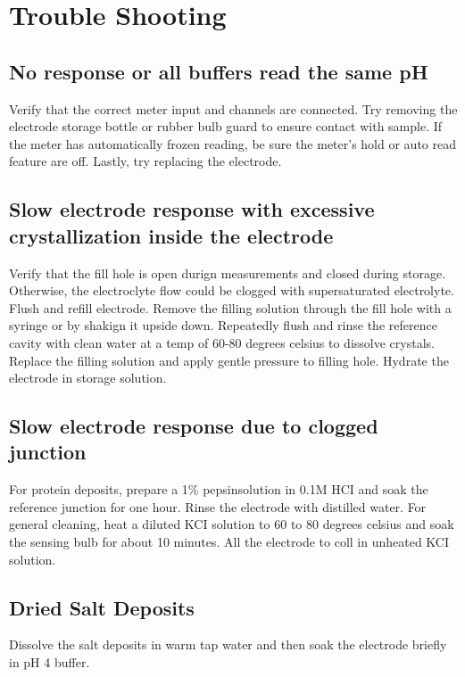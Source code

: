 \documentclass[12pt]{../SOP3}\usepackage[]{graphicx}\usepackage[]{color}
\begin{document}
\section{Trouble Shooting}

\subsection{No response or all buffers read the same pH}

\NP Verify that the correct meter input and channels are connected. Try removing the electrode storage bottle or rubber bulb guard to ensure contact with sample. If the meter has automatically frozen reading, be sure the meter's hold or auto read feature are off. Lastly, try replacing the electrode.  

\subsection{Slow electrode response with excessive crystallization inside the electrode}

\NP Verify that the fill hole is open durign measurements and closed during storage. Otherwise, the electroclyte flow could be clogged with supersaturated electrolyte. Flush and refill electrode. Remove the filling solution through the fill hole with a syringe or by shakign it upside down. Repeatedly flush and rinse the reference cavity with clean water at a temp of 60-80 degrees celsius to dissolve crystals. Replace the filling solution and apply gentle pressure to filling hole. Hydrate the electrode in storage solution.

\subsection{Slow electrode response due to clogged junction}

\NP For protein deposits, prepare a 1\% pepsinsolution in 0.1M HCI and soak the reference junction for one hour. Rinse the electrode with distilled water. For general cleaning, heat a diluted KCI solution to 60 to 80 degrees celsius and soak the sensing bulb for about 10 minutes. All the electrode to coll in unheated KCI solution.

\subsection{Dried Salt Deposits}

\NP Dissolve the salt deposits in warm tap water and then soak the electrode briefly in pH 4 buffer.
\end{document}
